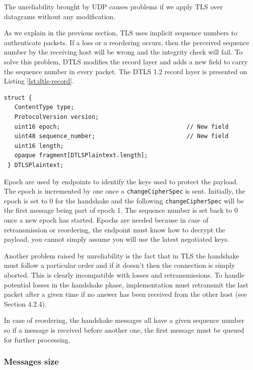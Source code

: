 The unreliability brought by UDP causes problems if we apply TLS over datagrams without any modification.

As we explain in the previous section, TLS uses implicit sequence numbers to authenticate packets. If a loss or a reordering occurs, then the perceived sequence number by the receiving host will be wrong and the integrity check will fail. To solve this problem, DTLS modifies the record layer and adds a new field to carry the sequence number in every packet. The DTLS 1.2 record layer is presented on Listing \ref{lst:dtls-record}.

\begin{lstlisting}[caption=DTLS record layer, label=lst:dtls-record]
struct {
   ContentType type;
   ProtocolVersion version;
   uint16 epoch;                                    // New field
   uint48 sequence_number;                          // New field
   uint16 length;
   opaque fragment[DTLSPlaintext.length];
 } DTLSPlaintext;
\end{lstlisting}


Epoch are used by endpoints to identify the keys used to protect the payload. The epoch is incremented by one once a \texttt{changeCipherSpec} is sent. Initially, the epoch is set to 0 for the handshake and the following \texttt{changeCipherSpec} will be the first message being part of epoch 1. The sequence number is set back to 0 once a new epoch has started. Epochs are needed because in case of retransmission or reordering, the endpoint must know how to decrypt the payload, you cannot simply assume you will use the latest negotiated keys.

Another problem raised by unreliability is the fact that in TLS the handshake must follow a particular order and if it doesn't then the connection is simply aborted. This is clearly incompatible with losses and retransmissions. To handle potential losses in the handshake phase, implementation must retransmit the last packet after a given time if no answer has been received from the other host (see \cite{rfc6347} Section 4.2.4).

In case of reordering, the handshake messages all have a given sequence number so if a message is received before another one, the first message must be queued for further processing.

\subsubsection{Messages size}

